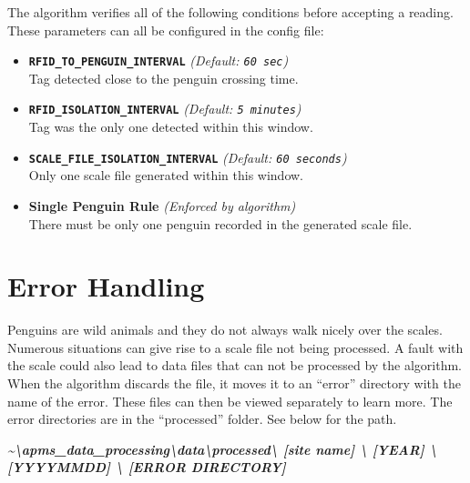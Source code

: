 \documentclass[
  letterpaper,
]{scrbook}
\providecommand{\tightlist}{%
  \setlength{\itemsep}{0pt}\setlength{\parskip}{0pt}}
\begin{document}
\begin{tcolorbox}[enhanced jigsaw, left=2mm, toptitle=1mm, breakable, opacitybacktitle=0.6, title={Basic Validation Configuration Checks}, colback=white, opacityback=0, rightrule=.15mm, leftrule=.75mm, colbacktitle=quarto-callout-note-color!10!white, bottomtitle=1mm, titlerule=0mm, coltitle=black, colframe=quarto-callout-note-color-frame, arc=.35mm, bottomrule=.15mm, toprule=.15mm]

The algorithm verifies all of the following conditions before accepting
a reading. These parameters can all be configured in the config file:

\begin{itemize}
\tightlist
\item
  \textbf{\texttt{RFID\_TO\_PENGUIN\_INTERVAL}} \emph{(Default:
  \texttt{60\ sec})}\\
  Tag detected close to the penguin crossing time.
\item
  \textbf{\texttt{RFID\_ISOLATION\_INTERVAL}} \emph{(Default:
  \texttt{5\ minutes})}\\
  Tag was the only one detected within this window.
\item
  \textbf{\texttt{SCALE\_FILE\_ISOLATION\_INTERVAL}} \emph{(Default:
  \texttt{60\ seconds})}\\
  Only one scale file generated within this window.
\item
  \textbf{Single Penguin Rule} \emph{(Enforced by algorithm)}\\
  There must be only one penguin recorded in the generated scale file.
\end{itemize}

\end{tcolorbox}

\section{Error Handling}\label{error-handling-1}

Penguins are wild animals and they do not always walk nicely over the
scales. Numerous situations can give rise to a scale file not being
processed. A fault with the scale could also lead to data files that can
not be processed by the algorithm. When the algorithm discards the file,
it moves it to an ``error'' directory with the name of the error. These
files can then be viewed separately to learn more. The error directories
are in the ``processed'' folder. See below for the path.

\textbf{\emph{\textasciitilde\textbackslash apms\_data\_processing\textbackslash data\textbackslash processed\textbackslash{}
{[}site name{]} \textbackslash{} {[}YEAR{]} \textbackslash{}
{[}YYYYMMDD{]} \textbackslash{} {[}ERROR DIRECTORY{]}}}
\end{document}
